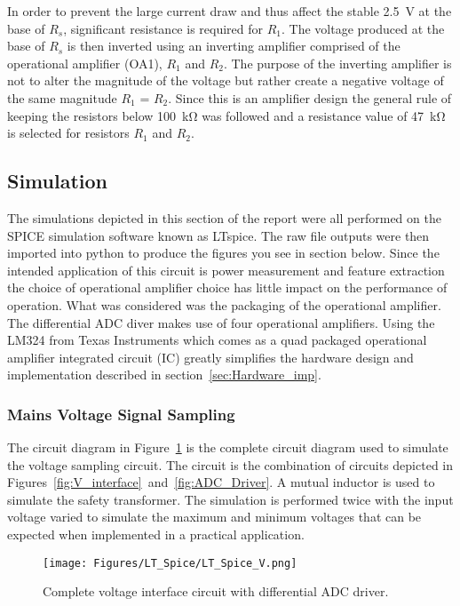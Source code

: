 In order to prevent the large current draw and thus affect the stable \qty{2.5}{\volt} at the base
of $R_{s}$, significant resistance is required for $R_{1}$. The voltage produced at the base of
$R_{s}$ is then inverted using an inverting amplifier comprised of the operational amplifier (OA1),
$R_{1}$ and $R_{2}$. The purpose of the inverting amplifier is not to alter the magnitude of the
voltage but rather create a negative voltage of the same magnitude $R_{1}$ = $R_{2}$. Since this is an amplifier design the general rule of keeping the resistors below \qty{100}{\kohm} was followed and a resistance value of \qty{47}{\kohm} is selected for resistors $R_{1}$ and $R_{2}$.

\subsection{Simulation}

The simulations depicted in this section of the report were all performed on the SPICE simulation software known as LTspice. The raw file outputs were then imported into python to produce the figures you see in section below. Since the intended application of this circuit is power measurement and feature extraction the choice of operational amplifier choice has little impact on the performance of operation. What was considered was the packaging of the operational amplifier. The differential ADC diver makes use of four operational amplifiers. Using the LM324 from Texas Instruments which comes as a quad packaged operational amplifier integrated circuit (IC) greatly simplifies the hardware design and implementation described in section~\ref{sec:Hardware_imp}.  

\subsubsection{Mains Voltage Signal Sampling}

The circuit diagram in Figure~\ref{fig:LT_Diagram_V} is the complete circuit diagram used to simulate the voltage sampling circuit. The circuit is the combination of circuits depicted in Figures~\ref{fig:V_interface}~and~\ref{fig:ADC_Driver}. A mutual inductor is used to simulate the safety transformer. The simulation is performed twice with the input voltage varied to simulate the maximum and minimum voltages that can be expected when implemented in a practical application.   

\begin{figure}[H]
    \centering
    \texttt{[image: Figures/LT\_Spice/LT\_Spice\_V.png]}
    \caption{Complete voltage interface circuit with differential ADC driver.}
    \label{fig:LT_Diagram_V}
\end{figure}

